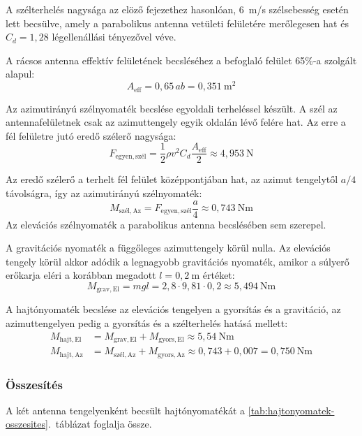 A szélterhelés nagysága az elöző fejezethez hasonlóan,
6~m/s szélsebesség esetén lett becsülve, amely
a parabolikus antenna vetületi felületére merőlegesen hat
és $C_d=1{,}28$ légellenállási tényezővel véve.

A rácsos antenna effektív felületének becsléséhez a
befoglaló felület 65\%-a szolgált alapul:
\begin{equation}
    A_{\mathrm{eff}} = 0{,}65\,ab = 0{,}351~\mathrm{m^2}
\end{equation}

Az azimutirányú szélnyomaték becslése egyoldali terheléssel
készült. A szél az antennafelületnek csak az azimuttengely
egyik oldalán lévő felére hat.
Az erre a fél felületre jutó eredő szélerő nagysága:
\begin{equation}
    F_{\mathrm{egyen,szél}}
    = \frac{1}{2}\rho v^2 C_d\frac{A_{\mathrm{eff}}}{2}
    \approx 4{,}953~\mathrm{N}
    \label{eq:szel-egyenerteku}
\end{equation}

Az eredő szélerő a terhelt fél felület középpontjában hat,
az azimut tengelytől $a/4$ távolságra, így az azimutirányú szélnyomaték:
\begin{equation}
    M_{\mathrm{szél,Az}}
    = F_{\mathrm{egyen,szél}}\frac{a}{4}
    \approx 0{,}743~\mathrm{Nm}
\end{equation}
Az elevációs szélnyomaték a parabolikus antenna becslésében
sem szerepel.

A gravitációs nyomaték a függőleges azimuttengely körül nulla.
Az elevációs tengely körül akkor adódik a legnagyobb
gravitációs nyomaték, amikor a súlyerő erőkarja eléri
a korábban megadott $l=0{,}2~\mathrm{m}$ értéket:
\begin{equation}
    M_{\mathrm{grav,El}}=mgl=2{,}8\cdot9{,}81\cdot0{,}2\approx5{,}494~\mathrm{Nm}
\end{equation}

A hajtónyomaték becslése az elevációs tengelyen a gyorsítás
és a gravitáció, az azimuttengelyen pedig a gyorsítás és a
szélterhelés hatásá mellett:
\begin{align}
    M_{\mathrm{hajt,El}} &= M_{\mathrm{grav,El}}+M_{\mathrm{gyors,El}}
    \approx5{,}54~\mathrm{Nm} \\
    M_{\mathrm{hajt,Az}} &= M_{\mathrm{szél,Az}}+M_{\mathrm{gyors,Az}}\approx0{,}743+0{,}007=0{,}750~\mathrm{Nm}
\end{align}



\subsubsection{Összesítés}
A két antenna tengelyenként becsült hajtónyomatékát
a \ref{tab:hajtonyomatek-osszesites}.~táblázat foglalja össze.

